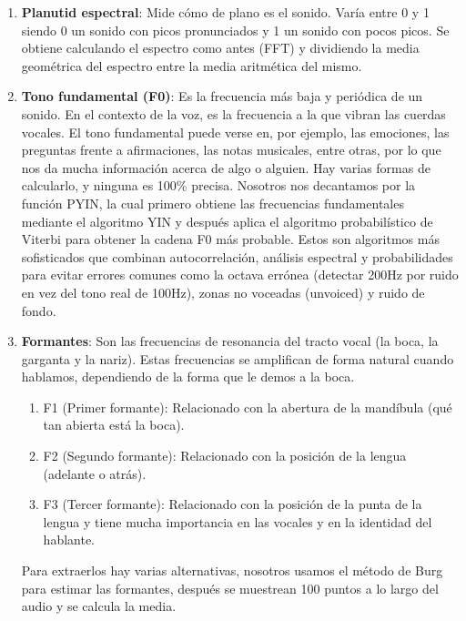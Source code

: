\begin{enumerate}
	\item \textbf{Planutid espectral}: Mide cómo de plano es el sonido. Varía entre 0 y 1 siendo 0 un sonido con picos pronunciados y 1 un sonido con pocos picos. Se obtiene calculando el espectro como antes (FFT) y dividiendo la media geométrica del espectro entre la media aritmética del mismo.
	\item \textbf{Tono fundamental (F0)}: Es la frecuencia más baja y periódica de un sonido. En el contexto de la voz, es la frecuencia a la que vibran las cuerdas vocales. El tono fundamental puede verse en, por ejemplo, las emociones, las preguntas frente a afirmaciones, las notas musicales, entre otras, por lo que nos da mucha información acerca de algo o alguien. Hay varias formas de calcularlo, y ninguna es 100\% precisa. Nosotros nos decantamos por la función PYIN, la cual primero obtiene las frecuencias fundamentales mediante el algoritmo YIN y después aplica el algoritmo probabilístico de Viterbi para obtener la cadena F0 más probable. Estos son algoritmos más sofisticados que combinan autocorrelación, análisis espectral y probabilidades para evitar errores comunes como la octava errónea (detectar 200Hz por ruido en vez del tono real de 100Hz), zonas no voceadas (unvoiced) y ruido de fondo.
	\item \textbf{Formantes}: Son las frecuencias de resonancia del tracto vocal (la boca, la garganta y la nariz). Estas frecuencias se amplifican de forma natural cuando hablamos, dependiendo de la forma que le demos a la boca.
	\begin{enumerate}
		\item F1 (Primer formante): Relacionado con la abertura de la mandíbula (qué tan abierta está la boca).
		\item F2 (Segundo formante): Relacionado con la posición de la lengua (adelante o atrás).
		\item F3 (Tercer formante): Relacionado con la posición de la punta de la lengua y tiene mucha importancia en las vocales y en la identidad del hablante.
	\end{enumerate}
Para extraerlos hay varias alternativas, nosotros usamos el método de Burg para estimar las formantes, después se muestrean 100 puntos a lo largo del audio y se calcula la media.

\end{enumerate}
